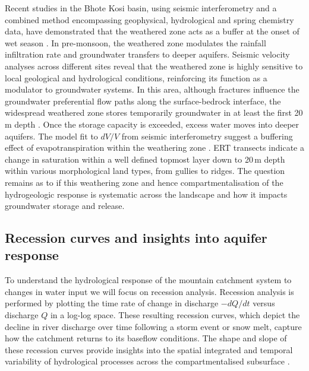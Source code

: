 \documentclass[hess, manuscript]{copernicus}
\begin{document}
Recent studies in the Bhote Kosi basin, using seismic interferometry and a combined method encompassing geophysical, hydrological and spring chemistry data, have demonstrated that the weathered zone acts as a buffer at the onset of wet season \citep{illien-etal-2021,teagai-etal-2026}. In pre-monsoon, the weathered zone modulates the rainfall infiltration rate and groundwater transfers to deeper aquifers. Seismic velocity analyses across different sites reveal that the weathered zone is highly sensitive to local geological and hydrological conditions, reinforcing its function as a modulator to groundwater systems. In this area, although fractures influence the groundwater preferential flow paths along the surface-bedrock interface, the widespread weathered zone stores temporarily groundwater in at least the first 20 m depth \citep{teagai-etal-2026}. Once the storage capacity is exceeded, excess water moves into deeper aquifers. The model fit to $dV/V$ from seismic interferometry suggest a buffering effect of evapotranspiration within the weathering zone \citep{illien-etal-2021}. ERT transects indicate a change in saturation within a well defined topmost layer down to 20\,m depth within various morphological land types, from gullies to ridges. The question remains as to if this weathering zone and hence compartmentalisation of the hydrogeologic response is systematic across the landscape and how it impacts groundwater storage and release.

\subsection{Recession curves and insights into aquifer response}

To understand the hydrological response of the mountain catchment system to changes in water input we will focus on recession analysis. Recession analysis is performed by plotting the time rate of change in discharge $-dQ/dt$ versus discharge $Q$ in a log-log space. These resulting recession curves, which depict the decline in river discharge over time following a storm event or snow melt, capture how the catchment returns to its baseflow conditions. The shape and slope of these recession curves provide insights into the spatial integrated and temporal variability of hydrological processes across the compartmentalised subsurface \citep[e.g.][]{roques-etal-2022}. 
\end{document}
